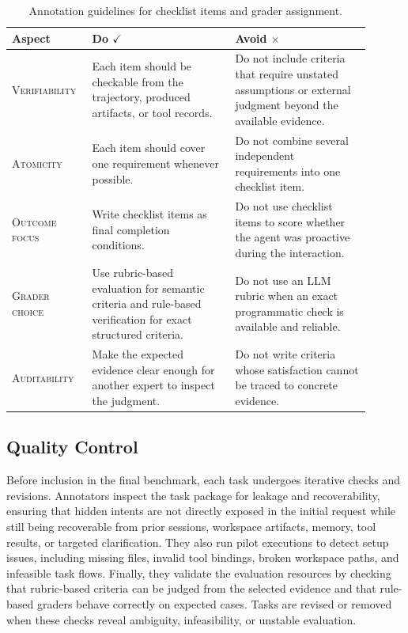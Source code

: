\documentclass{llmxive}
\begin{document}
\begin{table}[tb]
\centering
\small
\begin{tabular}{p{0.18\linewidth}p{0.37\linewidth}p{0.35\linewidth}}
\toprule[1.25pt]
\textbf{Aspect} & \textbf{Do} $\checkmark$ & \textbf{Avoid} $\times$ \\
\midrule[0.75pt]
\textsc{Verifiability} &
Each item should be checkable from the trajectory, produced artifacts, or tool records. &
Do not include criteria that require unstated assumptions or external judgment beyond the available evidence. \\
\midrule[0.75pt]
\textsc{Atomicity} &
Each item should cover one requirement whenever possible. &
Do not combine several independent requirements into one checklist item. \\
\midrule[0.75pt]
\textsc{Outcome focus} &
Write checklist items as final completion conditions. &
Do not use checklist items to score whether the agent was proactive during the interaction. \\
\midrule[0.75pt]
\textsc{Grader choice} &
Use rubric-based evaluation for semantic criteria and rule-based verification for exact structured criteria. &
Do not use an LLM rubric when an exact programmatic check is available and reliable. \\
\midrule[0.75pt]
\textsc{Auditability} &
Make the expected evidence clear enough for another expert to inspect the judgment. &
Do not write criteria whose satisfaction cannot be traced to concrete evidence. \\
\bottomrule[1.25pt]
\end{tabular}
\caption{Annotation guidelines for checklist items and grader assignment.}
\label{tab:annotation_checklists}
\end{table}

\subsection{Quality Control}
\label{app:data_quality_control}

Before inclusion in the final benchmark, each task undergoes iterative checks and revisions. Annotators inspect the task package for leakage and recoverability, ensuring that hidden intents are not directly exposed in the initial request while still being recoverable from prior sessions, workspace artifacts, memory, tool results, or targeted clarification. They also run pilot executions to detect setup issues, including missing files, invalid tool bindings, broken workspace paths, and infeasible task flows. Finally, they validate the evaluation resources by checking that rubric-based criteria can be judged from the selected evidence and that rule-based graders behave correctly on expected cases. Tasks are revised or removed when these checks reveal ambiguity, infeasibility, or unstable evaluation.
\end{document}
